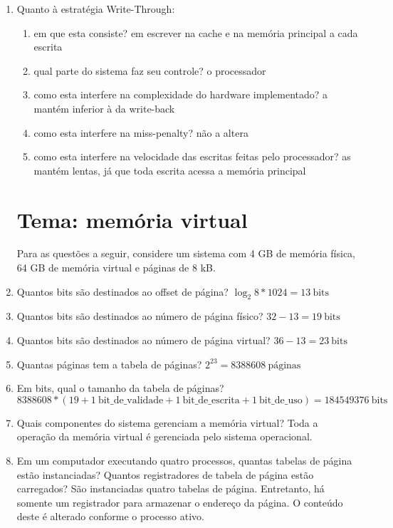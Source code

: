 \documentclass{article}
\begin{document}
\begin{enumerate}
\item Quanto à estratégia Write-Through:
\begin{enumerate}
    \item em que esta consiste? em escrever na cache e na memória principal a cada escrita
    \item qual parte do sistema faz seu controle? o processador
    \item como esta interfere na complexidade do hardware implementado? a mantém inferior à da write-back
    \item como esta interfere na miss-penalty? não a altera
    \item como esta interfere na velocidade das escritas feitas pelo processador? as mantém lentas, já que toda escrita acessa a memória principal
\end{enumerate}

\section*{Tema: memória virtual}

Para as questões a seguir, considere um sistema com 4 GB de memória física, 64 GB de memória virtual e páginas de 8 kB.

\item Quantos bits são destinados ao offset de página? $\log_2{8*1024} = 13\ \text{bits}$

\item Quantos bits são destinados ao número de página físico? $32 - 13 = 19\ \text{bits}$

\item Quantos bits são destinados ao número de página virtual? $36 - 13 = 23\ \text{bits}$

\item Quantas páginas tem a tabela de páginas? $2^{23} = 8388608\ \text{páginas}$

\item Em bits, qual o tamanho da tabela de páginas? $8388608 * (19 + 1\ \text{bit\_de\_validade} + 1\ \text{bit\_de\_escrita} + 1\ \text{bit\_de\_uso}) = 184549376\ \text{bits}$

\item Quais componentes do sistema gerenciam a memória virtual? Toda a operação da memória virtual é gerenciada pelo sistema operacional.

\item Em um computador executando quatro processos, quantas tabelas de página estão instanciadas? Quantos registradores de tabela de página estão carregados? São instanciadas quatro tabelas de página. Entretanto, há somente um registrador para armazenar o endereço da página. O conteúdo deste é alterado conforme o processo ativo.


\end{enumerate}
\end{document}
